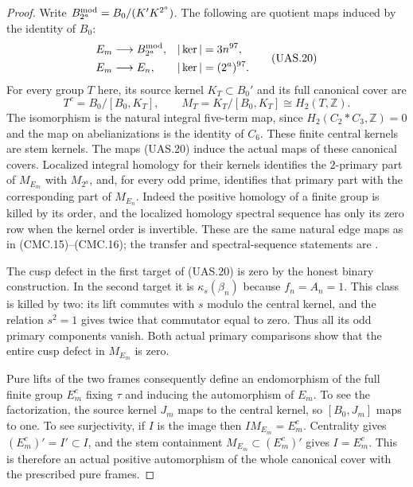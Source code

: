\begin{proof}
Write $B_{2^a}^{\rm mod}=B_0/(K'K^{2^a})$.
The following are quotient maps induced by the identity of $B_0$:
\[
 \begin{aligned}
 E_m&\longrightarrow B_{2^a}^{\rm mod},&
             |\ker|&=3n^{97},\\
 E_m&\longrightarrow E_n,&
             |\ker|&=(2^a)^{97}.
 \end{aligned}                                                   \tag{UAS.20}
\]
For every group $T$ here, its source kernel $K_T\subset B_0'$
and its full canonical cover are
\[
 T^c=B_0/[B_0,K_T],\qquad
 M_T=K_T/[B_0,K_T]\cong H_2(T,\mathbb Z).                         \tag{UAS.21}
\]
The isomorphism is the natural integral five-term map, since
$H_2(C_2*C_3,\mathbb Z)=0$ and the map on abelianizations is the
identity of $C_6$.  These finite central kernels are stem kernels.
The maps (UAS.20) induce the actual maps of these canonical covers.
Localized integral homology for their kernels identifies the
$2$-primary part of $M_{E_m}$ with $M_{2^a}$, and, for every odd
prime, identifies that primary part with the corresponding part
of $M_{E_n}$.  Indeed the positive homology of a finite group is
killed by its order, and the localized homology spectral sequence
has only its zero row when the kernel order is invertible.
These are the same natural edge maps as in (CMC.15)--(CMC.16);
the transfer and spectral-sequence statements are
\cite[Theorem~6.5.8, Corollary~6.5.10, Theorem~6.8.2 and
the five-term sequence~6.8.3]{CA_WeibelHA1994}.

The cusp defect in the first target of (UAS.20) is zero by the
honest binary construction.  In the second target it is
$\kappa_s(\beta_n)$ because $f_n=A_n=1$.
This class is killed by two: its lift commutes with $s$ modulo
the central kernel, and the relation $s^2=1$ gives twice that
commutator equal to zero.  Thus all its odd primary components
vanish.  Both actual primary comparisons show that the entire
cusp defect in $M_{E_m}$ is zero.

Pure lifts of the two frames consequently define an endomorphism
of the full finite group $E_m^c$ fixing $\tau$ and inducing the
automorphism of $E_m$.  To see the factorization, the source
kernel $J_m$ maps to the central kernel, so $[B_0,J_m]$ maps to
one.  To see surjectivity, if $I$ is the image then
$IM_{E_m}=E_m^c$.  Centrality gives $(E_m^c)'=I'\subset I$,
and the stem containment $M_{E_m}\subset(E_m^c)'$ gives
$I=E_m^c$.  This is therefore an actual positive automorphism
of the whole canonical cover with the prescribed pure frames.


\end{proof}
